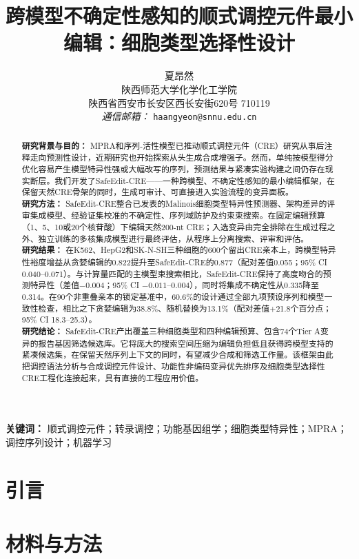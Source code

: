 \documentclass[10pt,a4paper]{article}
\title{\textbf{跨模型不确定性感知的顺式调控元件最小编辑：细胞类型选择性设计}}
\author{夏昂然\\
陕西师范大学化学化工学院\\
陕西省西安市长安区西长安街620号 710119\\[0.35em]
\textit{通信邮箱：} \texttt{haangyeon@snnu.edu.cn}}
\date{}
\begin{document}
\maketitle
\linenumbers

\begin{abstract}
\textbf{研究背景与目的：} MPRA和序列-活性模型已推动顺式调控元件（CRE）研究从事后注释走向预测性设计，近期研究也开始探索从头生成合成增强子。然而，单纯按模型得分优化容易产生模型特异性强或大幅改写的序列，预测结果与紧凑实验构建之间仍存在现实断层。我们开发了SafeEdit-CRE——一种跨模型、不确定性感知的最小编辑框架，在保留天然CRE骨架的同时，生成可审计、可直接进入实验流程的变异面板。\\
\textbf{研究方法：} SafeEdit-CRE整合已发表的Malinois细胞类型特异性预测器、架构差异的评审集成模型、经验证集校准的不确定性、序列域防护及约束束搜索。在固定编辑预算（1、5、10或20个核苷酸）下编辑天然200-nt CRE；入选变异由完全排除在生成过程之外、独立训练的多核集成模型进行最终评估，从程序上分离搜索、评审和评估。\\
\textbf{研究结果：} 在K562、HepG2和SK-N-SH三种细胞的600个留出CRE亲本上，跨模型特异性裕度增益从贪婪编辑的0.822提升至SafeEdit-CRE的0.877（配对差值0.055；95\% CI 0.040--0.071）。与计算量匹配的主模型束搜索相比，SafeEdit-CRE保持了高度吻合的预测特异性（差值$-0.004$；95\% CI $-0.011$--$0.004$），同时将集成不确定性从0.335降至0.314。在90个非重叠亲本的锁定基准中，60.6\%的设计通过全部九项预设序列和模型一致性检查，相比之下贪婪编辑为38.8\%、随机替换为13.1\%（配对差值+21.8个百分点；95\% CI 18.3--25.3）。\\
\textbf{研究结论：} SafeEdit-CRE产出覆盖三种细胞类型和四种编辑预算、包含74个Tier A变异的报告基因筛选候选库。它将庞大的搜索空间压缩为编辑负担低且获得跨模型支持的紧凑候选集，在保留天然序列上下文的同时，有望减少合成和筛选工作量。该框架由此把调控语法分析与合成调控元件设计、功能性非编码变异优先排序及细胞类型选择性CRE工程化连接起来，具有直接的工程应用价值。
\end{abstract}

\noindent\textbf{关键词：} 顺式调控元件；转录调控；功能基因组学；细胞类型特异性；MPRA；调控序列设计；机器学习

\section{引言}


\section{材料与方法}

\end{document}
